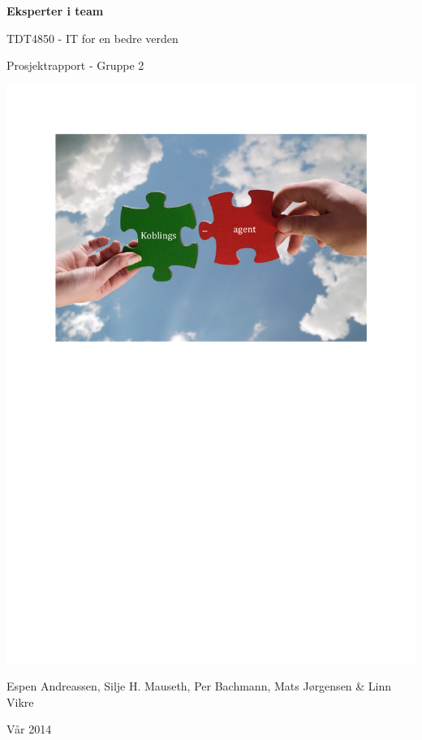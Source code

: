 \begin{titlepage}
\begin{center}
{\Huge {\bf Eksperter i team}}
\par
\vspace{0.1in}
{\LARGE TDT4850 - IT for en bedre verden}
\par
{\LARGE Prosjektrapport - Gruppe 2}
\par

\vspace{0.35in}

\includegraphics[scale=1.05, trim=3.5cm 19cm 0cm 1cm]{Prosjektforside.pdf}

\par

\vfill{}
\vspace{0.65in}
Espen Andreassen, Silje H. Mauseth, Per Bachmann, Mats Jørgensen \& Linn Vikre
\par
Vår 2014
\end{center}
\end{titlepage}
